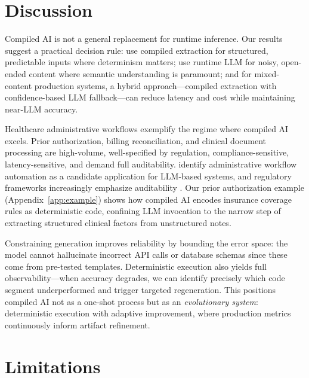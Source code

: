 \documentclass[11pt]{article}
\begin{document}
\section{Discussion}
\label{sec:discussion}

Compiled AI is not a general replacement for runtime inference. Our results suggest a practical decision rule: use compiled extraction for structured, predictable inputs where determinism matters; use runtime LLM for noisy, open-ended content where semantic understanding is paramount; and for mixed-content production systems, a hybrid approach---compiled extraction with confidence-based LLM fallback---can reduce latency and cost while maintaining near-LLM accuracy.

Healthcare administrative workflows exemplify the regime where compiled AI excels. Prior authorization, billing reconciliation, and clinical document processing are high-volume, well-specified by regulation, compliance-sensitive, latency-sensitive, and demand full auditability. \citet{qiu2024healthcare} identify administrative workflow automation as a candidate application for LLM-based systems, and regulatory frameworks increasingly emphasize auditability \citep{fda2025}. Our prior authorization example (Appendix~\ref{app:example}) shows how compiled AI encodes insurance coverage rules as deterministic code, confining LLM invocation to the narrow step of extracting structured clinical factors from unstructured notes.

Constraining generation improves reliability by bounding the error space: the model cannot hallucinate incorrect API calls or database schemas since these come from pre-tested templates. Deterministic execution also yields full observability---when accuracy degrades, we can identify precisely which code segment underperformed and trigger targeted regeneration. This positions compiled AI not as a one-shot process but as an \emph{evolutionary system}: deterministic execution with adaptive improvement, where production metrics continuously inform artifact refinement.

\section{Limitations}
\label{sec:limitations}
\end{document}
